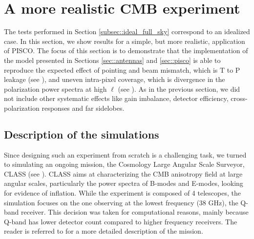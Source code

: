 \documentclass[a4paper,11pt]{article}
\begin{document}
\section{A more realistic CMB experiment}
\label{sec::realistic_cmb_experiment}


The tests performed in Section \ref{subsec::ideal_full_sky} correspond to an idealized case. In this section, we show results for a simple, but more realistic, application of PISCO. The focus of this section is to demonstrate that the implementation of the model presented in Sections \ref{sec::antennas} and \ref{sec::pisco} is able to reproduce the expected effect of pointing and beam mismatch, which is T to P leakage (see \cite{Ade_2019ywi}), and uneven intra-pixel coverage, which is divergence in the polarization power spectra at high $\ell$ (see \cite{2005poutanen}). As in the previous section, we did not include other systematic effects like gain imbalance, detector efficiency, cross-polarization responses and far sidelobes.
 
\subsection{Description of the simulations}

Since designing such an experiment from scratch is a challenging task, we turned to simulating an ongoing mission, the Cosmology Large Angular Scale Surveyor, CLASS (see \cite{2014SPIE.9153E..1IE}). CLASS aims at characterizing the CMB anisotropy field at large angular scales, particularly the power spectra of B-modes and E-modes, looking for evidence of inflation. While the experiment is composed of 4 telescopes, the simulation focuses on the one observing at the lowest frequency (38 GHz), the Q-band receiver. This decision was taken for computational reasons, mainly because Q-band has lower detector count compared to higher frequency receivers. The reader is referred to \cite{2016SPIE.9914E..1KH} for a more detailed description of the mission.
\end{document}
